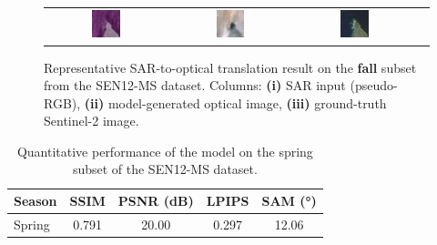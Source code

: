 \begin{figure}[h!]
\begin{tabular}{c *{3}{c}}
        \includegraphics[width=0.25\textwidth]{img/seasons/fall/sample_000015_sar_pseudo.png} &
        \includegraphics[width=0.25\textwidth]{img/seasons/fall/sample_000015_pred_rgb.png} &
        \includegraphics[width=0.25\textwidth]{img/seasons/fall/sample_000015_true_rgb.png} \\

    \end{tabular}
    \caption[Qualitative results on the fall subset]{%
    Representative SAR-to-optical translation result on the \textbf{fall} subset from the SEN12-MS dataset. 
    Columns: \textbf{(i)} SAR input (pseudo-RGB), 
    \textbf{(ii)} model-generated optical image, 
    \textbf{(iii)} ground-truth Sentinel-2 image.
    }
    \label{fig:appendix_fall}
\end{figure}

\newpage
\vspace{2em} 

\begin{table}[h!]
\centering
\caption[Quantitative results on the spring subset]{Quantitative performance of the model on the spring subset of the SEN12-MS dataset.}
\begin{tabular}{lcccc}
\toprule
\textbf{Season} & \textbf{SSIM} & \textbf{PSNR (dB)} & \textbf{LPIPS} & \textbf{SAM (°)} \\
\midrule
Spring & 0.791 & 20.00 & 0.297 & 12.06 \\
\bottomrule
\end{tabular}
\label{tab:spring_results}
\end{table}

